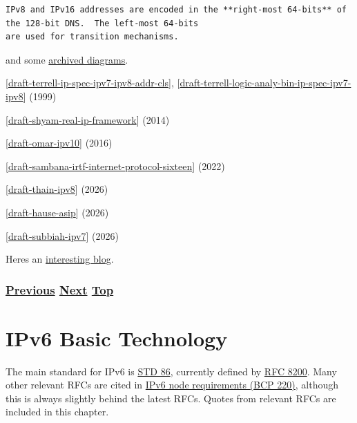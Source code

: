 \documentclass[
]{article}
\begin{document}
\begin{verbatim}
IPv8 and IPv16 addresses are encoded in the **right-most 64-bits** of the 128-bit DNS.  The left-most 64-bits
are used for transition mechanisms.
\end{verbatim}

and some
\href{https://web.archive.org/web/20000412004245/http://www.unir.com/images/headers.gif}{archived
diagrams}.

{[}\href{https://datatracker.ietf.org/doc/draft-terrell-ip-spec-ipv7-ipv8-addr-cls/}{draft-terrell-ip-spec-ipv7-ipv8-addr-cls}{]},
{[}\href{https://datatracker.ietf.org/doc/draft-terrell-logic-analy-bin-ip-spec-ipv7-ipv8/}{draft-terrell-logic-analy-bin-ip-spec-ipv7-ipv8}{]}
(1999)

{[}\href{https://datatracker.ietf.org/doc/draft-shyam-real-ip-framework/}{draft-shyam-real-ip-framework}{]}
(2014)

{[}\href{https://datatracker.ietf.org/doc/draft-omar-ipv10/}{draft-omar-ipv10}{]}
(2016)

{[}\href{https://datatracker.ietf.org/doc/draft-sambana-irtf-internet-protocol-sixteen/}{draft-sambana-irtf-internet-protocol-sixteen}{]}
(2022)

{[}\href{https://datatracker.ietf.org/doc/draft-thain-ipv8/}{draft-thain-ipv8}{]}
(2026)

{[}\href{https://datatracker.ietf.org/doc/draft-hause-asip/}{draft-hause-asip}{]}
(2026)

{[}\href{https://datatracker.ietf.org/doc/draft-subbiah-ipv7/}{draft-subbiah-ipv7}{]}
(2026)

Here\textquotesingle s an
\href{https://www.ip.network/blog/what-is-ipv8-protocol}{interesting
blog}.

\subsubsection{\texorpdfstring{\hyperref[why-version-6]{Previous}
\hyperref[ipv6-basic-technology]{Next}
\hyperref[introduction-and-foreword]{Top}}{Previous Next Top}}\label{previous-next-top-8}

\pagebreak

\section{IPv6 Basic Technology}\label{ipv6-basic-technology}

The main standard for IPv6 is
\href{https://www.rfc-editor.org/info/std86}{STD 86}, currently defined
by \href{https://www.rfc-editor.org/info/rfc8200}{RFC 8200}. Many other
relevant RFCs are cited in
\href{https://www.rfc-editor.org/info/bcp220}{IPv6 node requirements
(BCP 220)}, although this is always slightly behind the latest RFCs.
Quotes from relevant RFCs are included in this chapter.
\end{document}

